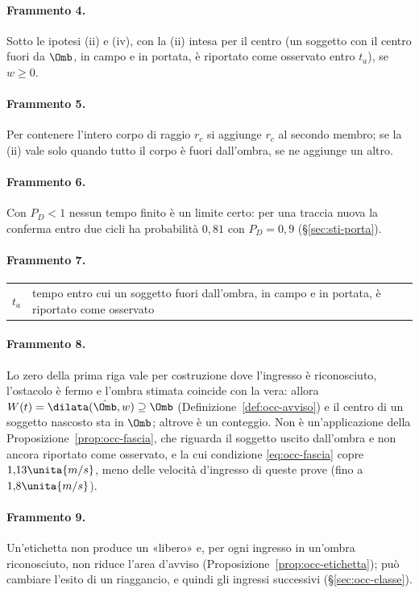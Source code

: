 \paragraph{Frammento 4.}
Sotto le ipotesi (ii) e (iv), con la (ii) intesa per il centro (un soggetto con il centro fuori da $\Omb$, in campo e in portata, è riportato come osservato entro $t_a$), se $w\ge0$.

\paragraph{Frammento 5.}
Per contenere l'intero corpo di raggio $r_c$ si aggiunge $r_c$ al secondo membro; se la (ii) vale solo quando tutto il corpo è fuori dall'ombra, se ne aggiunge un altro. 

\paragraph{Frammento 6.}
Con $P_D<1$ nessun tempo finito è un limite certo: per una traccia nuova la conferma entro due cicli ha probabilità $0{,}81$ con $P_D=0{,}9$ (\S\ref{sec:sti-porta}).

\paragraph{Frammento 7.}
\begin{tabular}{lp{10cm}}
$t_a$ & tempo entro cui un soggetto fuori dall'ombra, in campo e in portata, è riportato come osservato\\
\end{tabular}

\paragraph{Frammento 8.}
Lo zero della prima riga vale per costruzione dove l'ingresso è riconosciuto, l'ostacolo è fermo e l'ombra stimata coincide con la vera: allora $W(t)=\dilata(\hat\Omb,w)\supseteq\Omb$ (Definizione~\ref{def:occ-avviso}) e il centro di un soggetto nascosto sta in $\Omb$; altrove è un conteggio. Non è un'applicazione della Proposizione~\ref{prop:occ-fascia}, che riguarda il soggetto uscito dall'ombra e non ancora riportato come osservato, e la cui condizione \eqref{eq:occ-fascia} copre $1{,}13\unita{m/s}$, meno delle velocità d'ingresso di queste prove (fino a $1{,}8\unita{m/s}$).

\paragraph{Frammento 9.}
Un'etichetta non produce un «libero» e, per ogni ingresso in un'ombra riconosciuto, non riduce l'area d'avviso (Proposizione~\ref{prop:occ-etichetta}); può cambiare l'esito di un riaggancio, e quindi gli ingressi successivi (\S\ref{sec:occ-classe}).

